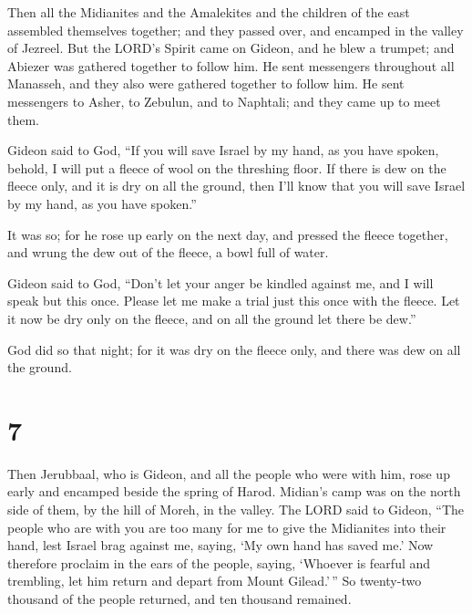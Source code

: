  Then all the Midianites and the Amalekites and the
children of the east assembled themselves together; and they passed
over, and encamped in the valley of Jezreel.  But the
LORD's Spirit came on Gideon, and he blew a trumpet; and Abiezer was
gathered together to follow him.  He sent messengers
throughout all Manasseh, and they also were gathered together to follow
him. He sent messengers to Asher, to Zebulun, and to Naphtali; and they
came up to meet them.

 Gideon said to God, ``If you will save Israel by my
hand, as you have spoken,  behold, I will put a fleece of
wool on the threshing floor. If there is dew on the fleece only, and it
is dry on all the ground, then I'll know that you will save Israel by my
hand, as you have spoken.''

 It was so; for he rose up early on the next day, and
pressed the fleece together, and wrung the dew out of the fleece, a bowl
full of water.

 Gideon said to God, ``Don't let your anger be kindled
against me, and I will speak but this once. Please let me make a trial
just this once with the fleece. Let it now be dry only on the fleece,
and on all the ground let there be dew.''

 God did so that night; for it was dry on the fleece
only, and there was dew on all the ground.

\hypertarget{section-6}{%
\section{7}\label{section-6}}

 Then Jerubbaal, who is Gideon, and all the people who
were with him, rose up early and encamped beside the spring of Harod.
Midian's camp was on the north side of them, by the hill of Moreh, in
the valley.  The LORD said to Gideon, ``The people who are
with you are too many for me to give the Midianites into their hand,
lest Israel brag against me, saying, `My own hand has saved me.'
 Now therefore proclaim in the ears of the people, saying,
`Whoever is fearful and trembling, let him return and depart from Mount
Gilead.'\,'' So twenty-two thousand of the people returned, and ten
thousand remained.


